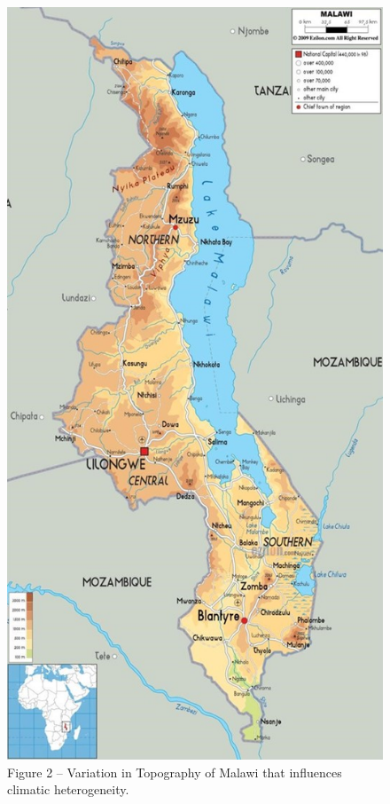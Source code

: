 \documentclass[
]{book}
\begin{document}
\begin{figure}
\centering
\includegraphics{images/topography.jpg}
\caption{Figure 2 -- Variation in Topography of Malawi that influences climatic heterogeneity.}
\end{figure}
\end{document}

